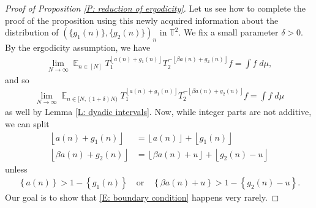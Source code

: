 \documentclass[11pt]{amsart}
\theoremstyle{definition}
\DeclareMathOperator*{\E}{\mathbb{E}}
\newcommand{\T}{{\mathbb T}}
\newcommand{\1}{{\mathbf{1}}}
\newcommand{\floor}[1]{{\left \lfloor #1 \right \rfloor}}
\newcommand{\rem}[1]{\left \{ #1 \right \}}
\begin{document}
\begin{proof}[Proof of Proposition \ref{P: reduction of ergodicity}]
    
Let us see how to complete the proof of the proposition using this newly acquired information about the distribution of $(\{g_1(n)\}, \{g_2(n)\})_n$ in $\T^2$. We fix a small parameter $\delta>0$.
By the ergodicity assumption, we have
\begin{align*}
    \lim_{N\to\infty}\E_{n\in[N]} T_1^{\floor{{a}(n)+g_1(n)}}T_2^{-\floor{\beta {a}(n) + g_2(n)}}f = \int f\; d\mu,
\end{align*}
and so 
\begin{align*}
    \lim_{N\to\infty}\E_{n\in [N, (1+\delta)N)} T_1^{\floor{{a}(n)+g_1(n)}}T_2^{-\floor{\beta {a}(n) + g_2(n)}}f = \int f\; d\mu
\end{align*}
as well by Lemma \ref{L: dyadic intervals}. Now, while integer parts are not additive, we can split
\begin{align*}
    \floor{{a}(n)+g_1(n)} &= \floor{{a}(n)} + \floor{g_1(n)}\\
    \floor{\beta {a}(n) + g_2(n)} &= \floor{\beta {a}(n)+u} + \floor{g_2(n)-u}
\end{align*}
unless
\begin{align}\label{E: boundary condition}
    \rem{{a}(n)} > 1 - \rem{g_1(n)} \quad \textrm{or}\quad \rem{\beta {a}(n)+u} > 1 - \rem{g_2(n)-u}.
\end{align}
Our goal is to show that \eqref{E: boundary condition} happens very rarely. 


\end{proof}
\end{document}

